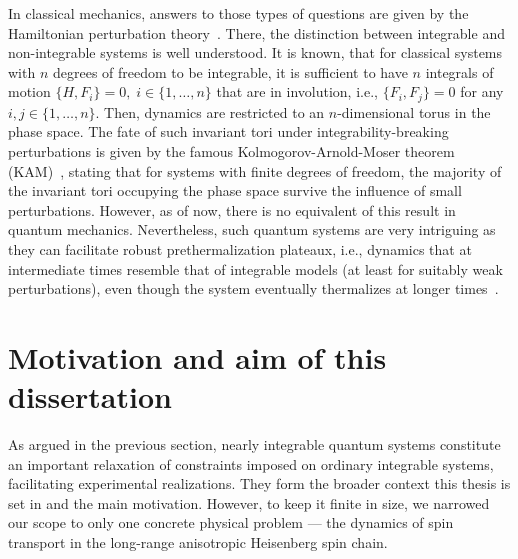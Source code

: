In classical mechanics, answers to those types of questions are given by the Hamiltonian perturbation
theory~\autocite{Arnold1990}. There, the distinction between integrable and non-integrable systems is
well understood. It is known, that for classical systems with \(n\) degrees of freedom
to be integrable, it is sufficient to have \(n\) integrals of motion \(\{H,F_i\} = 0,\; i \in \{1,\ldots,n\} \) that
are in involution, i.e., \(\{F_i,F_j\} = 0\) for any \(i,j\in\{1,\ldots,n\}\). Then, dynamics are restricted to an \(n\)-dimensional
torus in the phase space. The fate of such invariant tori under integrability-breaking perturbations is given by the
famous Kolmogorov-Arnold-Moser theorem (KAM)~\autocite{Kolmogorov1954, Arnold1963, Moser1962}, stating that for systems
with finite degrees of freedom, the majority of the invariant tori occupying the phase space survive the influence of small
perturbations. However, as of now, there is no equivalent of this result in quantum mechanics.
Nevertheless, such quantum systems are very intriguing as they can facilitate robust prethermalization plateaux,
i.e., dynamics that at intermediate times resemble that of integrable models
(at least for suitably weak perturbations), even though the system eventually thermalizes at longer times~\autocite{Mallayya2019, Bertini2015,Berges2004,Langen2016}.

\section{Motivation and aim of this dissertation}
As argued in the previous section, nearly integrable quantum systems constitute an important relaxation
of constraints imposed on ordinary integrable systems, facilitating experimental realizations. They form the broader context this
thesis is set in and the main motivation. However, to keep it finite in size, we narrowed
our scope to only one concrete physical problem — the dynamics of spin transport in the long-range
anisotropic Heisenberg spin chain.

